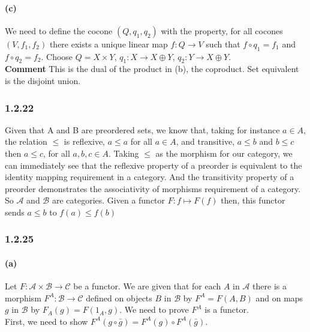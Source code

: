 \documentclass{article}
\begin{document}
\paragraph{(c)}

We need to define the cocone $(Q, q_1, q_2)$ with the property, for all cocones $(V, f_1, f_2)$ there exists a unique linear map $f\colon Q \rightarrow V$ such that $f \circ q_1 = f_1$ and $f \circ q_2 = f_2$. Choose $Q= X \times Y$, $q_1\colon X \rightarrow X \oplus Y$, $q_2\colon Y \rightarrow X \oplus Y$. \\

\textbf{Comment} This is the dual of the product in (b), the coproduct. Set equivalent is the disjoint union.

\subsubsection*{1.2.22}

Given that A and B are preordered sets, we know that, taking for instance $a \in A$, the relation $\leq$ is reflexive, $a \leq a$ for all $a \in A$, and transitive, $a \leq b$ and $b \leq c$ then $a \leq c$, for all $a, b, c \in A$.  Taking $\leq$ as the morphism for our category, we can immediately see that the reflexive property of a preorder is equivalent to the identity mapping requirement in a category. And the transitivity property of a preorder demonstrates the associativity of morphisms requirement of a category. So $\mathcal{A}$ and $\mathcal{B}$ are categories. Given a functor $F: f \mapsto F(f)$ then, this functor sends $a \leq b$ to $f(a) \leq f(b)$

\subsubsection*{1.2.25}

\paragraph{(a)}

Let $F: \mathcal{A} \times \mathcal{B} \rightarrow \mathcal{C}$ be a functor. We are given that for each $A$ in $\mathcal{A}$ there is a morphism $F^A: \mathcal{B} \rightarrow \mathcal{C}$ defined on objects $B$ in $\mathcal{B}$ by $F^A = F(A,B)$ and on maps $g$ in $\mathcal{B}$  by $F_A(g) = F(1_A, g)$. We need to prove $F^A$ is a functor.\\

First, we need to show  $F^A(g \circ \bar{g}) = F^A(g) \circ F^A(\bar{g})$.
\end{document}
